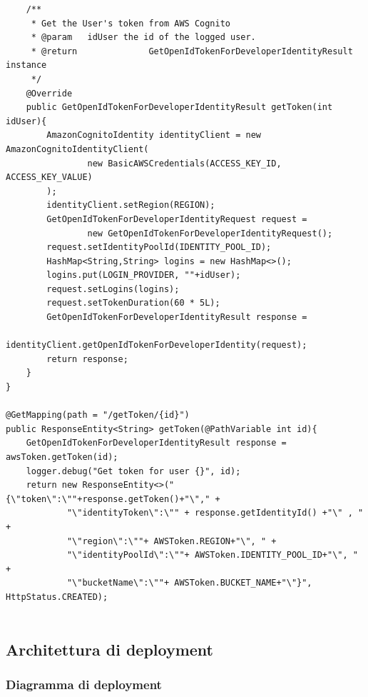 \documentclass[12pt]{article}
\begin{document}
\begin{itemize}
\begin{itemize}
\begin{lstlisting}
    /**
     * Get the User's token from AWS Cognito
     * @param	idUser the id of the logged user.
     * @return				GetOpenIdTokenForDeveloperIdentityResult instance
     */
    @Override
    public GetOpenIdTokenForDeveloperIdentityResult getToken(int idUser){
        AmazonCognitoIdentity identityClient = new AmazonCognitoIdentityClient(
                new BasicAWSCredentials(ACCESS_KEY_ID, ACCESS_KEY_VALUE)
        );
        identityClient.setRegion(REGION);
        GetOpenIdTokenForDeveloperIdentityRequest request =
                new GetOpenIdTokenForDeveloperIdentityRequest();
        request.setIdentityPoolId(IDENTITY_POOL_ID);
        HashMap<String,String> logins = new HashMap<>();
        logins.put(LOGIN_PROVIDER, ""+idUser);
        request.setLogins(logins);
        request.setTokenDuration(60 * 5L);
        GetOpenIdTokenForDeveloperIdentityResult response =
                identityClient.getOpenIdTokenForDeveloperIdentity(request);
        return response;
    }
}

@GetMapping(path = "/getToken/{id}")
public ResponseEntity<String> getToken(@PathVariable int id){
	GetOpenIdTokenForDeveloperIdentityResult response = awsToken.getToken(id);
	logger.debug("Get token for user {}", id);
	return new ResponseEntity<>("{\"token\":\""+response.getToken()+"\"," +
			"\"identityToken\":\"" + response.getIdentityId() +"\" , " +
			"\"region\":\""+ AWSToken.REGION+"\", " +
			"\"identityPoolId\":\""+ AWSToken.IDENTITY_POOL_ID+"\", " +
			"\"bucketName\":\""+ AWSToken.BUCKET_NAME+"\"}", HttpStatus.CREATED);
	
            \end{lstlisting}
             
             \end{itemize}
        \end{itemize}
             
\subsection{Architettura di deployment}
\subsubsection{Diagramma di deployment}
\end{document}
